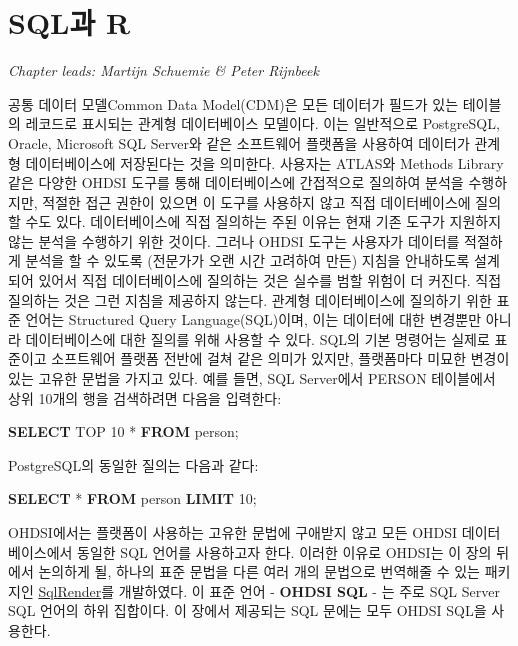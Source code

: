 \documentclass[10.5pt]{book}
\newenvironment{Shaded}{\begin{snugshade}}{\end{snugshade}}
\newcommand{\KeywordTok}[1]{\textcolor[rgb]{0.13,0.29,0.53}{\textbf{#1}}}
\newcommand{\DecValTok}[1]{\textcolor[rgb]{0.00,0.00,0.81}{#1}}
\newcommand{\NormalTok}[1]{#1}
\theoremstyle{definition}
\theoremstyle{definition}
\theoremstyle{definition}
\theoremstyle{remark}
\begin{document}
\chapter{SQL과 R}\label{SqlAndR}

\emph{Chapter leads: Martijn Schuemie \& Peter Rijnbeek}

공통 데이터 모델Common Data Model(CDM)은 모든 데이터가 필드가 있는
테이블의 레코드로 표시되는 관계형 데이터베이스 모델이다. 이는 일반적으로
PostgreSQL, Oracle, Microsoft SQL Server와 같은 소프트웨어 플랫폼을
사용하여 데이터가 관계형 데이터베이스에 저장된다는 것을 의미한다.
사용자는 ATLAS와 Methods Library 같은 다양한 OHDSI 도구를 통해
데이터베이스에 간접적으로 질의하여 분석을 수행하지만, 적절한 접근 권한이
있으면 이 도구를 사용하지 않고 직접 데이터베이스에 질의할 수도 있다.
데이터베이스에 직접 질의하는 주된 이유는 현재 기존 도구가 지원하지 않는
분석을 수행하기 위한 것이다. 그러나 OHDSI 도구는 사용자가 데이터를
적절하게 분석을 할 수 있도록 (전문가가 오랜 시간 고려하여 만든) 지침을
안내하도록 설계되어 있어서 직접 데이터베이스에 질의하는 것은 실수를 범할
위험이 더 커진다. 직접 질의하는 것은 그런 지침을 제공하지 않는다. 관계형
데이터베이스에 질의하기 위한 표준 언어는 Structured Query
Language(SQL)이며, 이는 데이터에 대한 변경뿐만 아니라 데이터베이스에
대한 질의를 위해 사용할 수 있다. SQL의 기본 명령어는 실제로 표준이고
소프트웨어 플랫폼 전반에 걸쳐 같은 의미가 있지만, 플랫폼마다 미묘한
변경이 있는 고유한 문법을 가지고 있다. 예를 들면, SQL Server에서 PERSON
테이블에서 상위 10개의 행을 검색하려면 다음을 입력한다: 

\begin{Shaded}
\begin{Highlighting}[]
\KeywordTok{SELECT}\NormalTok{ TOP }\DecValTok{10}\NormalTok{ * }\KeywordTok{FROM}\NormalTok{ person;}
\end{Highlighting}
\end{Shaded}

PostgreSQL의 동일한 질의는 다음과 같다:

\begin{Shaded}
\begin{Highlighting}[]
\KeywordTok{SELECT}\NormalTok{ * }\KeywordTok{FROM}\NormalTok{ person }\KeywordTok{LIMIT} \DecValTok{10}\NormalTok{;}
\end{Highlighting}
\end{Shaded}

OHDSI에서는 플랫폼이 사용하는 고유한 문법에 구애받지 않고 모든 OHDSI
데이터베이스에서 동일한 SQL 언어를 사용하고자 한다. 이러한 이유로
OHDSI는 이 장의 뒤에서 논의하게 될, 하나의 표준 문법을 다른 여러 개의
문법으로 번역해줄 수 있는 패키지인
\href{https://ohdsi.github.io/SqlRender/}{SqlRender}를 개발하였다. 이
표준 언어 - \textbf{OHDSI SQL} - 는 주로 SQL Server SQL 언어의 하위
집합이다. 이 장에서 제공되는 SQL 문에는 모두 OHDSI SQL을 사용한다.
 
\end{document}
